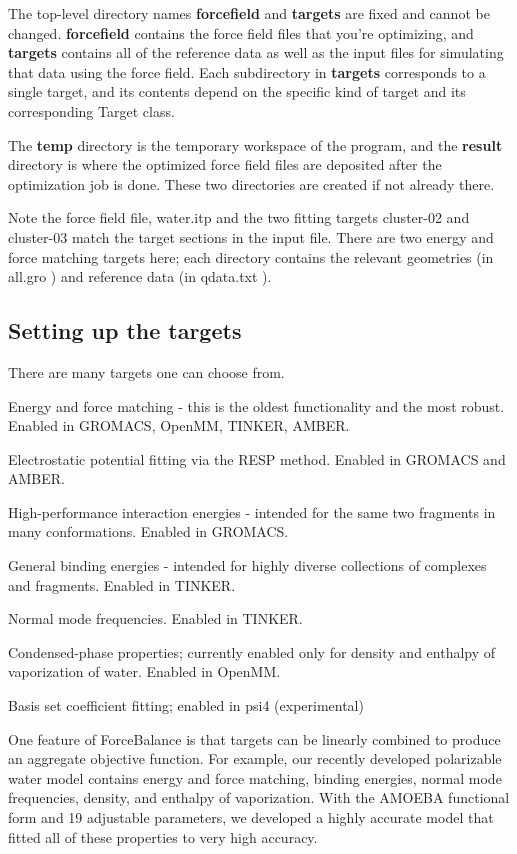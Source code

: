 The top-\/level directory names {\bfseries forcefield} and {\bfseries targets} are fixed and cannot be changed. {\bfseries forcefield} contains the force field files that you're optimizing, and {\bfseries targets} contains all of the reference data as well as the input files for simulating that data using the force field. Each subdirectory in {\bfseries targets} corresponds to a single target, and its contents depend on the specific kind of target and its corresponding {\ttfamily Target} class.

The {\bfseries temp} directory is the temporary workspace of the program, and the {\bfseries result} directory is where the optimized force field files are deposited after the optimization job is done. These two directories are created if not already there.

Note the force field file, {\ttfamily water.\-itp} and the two fitting targets {\ttfamily cluster-\/02} and {\ttfamily cluster-\/03} match the {\ttfamily target} sections in the input file. There are two energy and force matching targets here; each directory contains the relevant geometries (in {\ttfamily all.\-gro} ) and reference data (in {\ttfamily qdata.\-txt} ).\hypertarget{usage_targets}{}\subsection{Setting up the targets}\label{usage_targets}
There are many targets one can choose from.

\begin{DoxyItemize}
\item Energy and force matching -\/ this is the oldest functionality and the most robust. Enabled in G\-R\-O\-M\-A\-C\-S, Open\-M\-M, T\-I\-N\-K\-E\-R, A\-M\-B\-E\-R. \item Electrostatic potential fitting via the R\-E\-S\-P method. Enabled in G\-R\-O\-M\-A\-C\-S and A\-M\-B\-E\-R. \item High-\/performance interaction energies -\/ intended for the same two fragments in many conformations. Enabled in G\-R\-O\-M\-A\-C\-S. \item General binding energies -\/ intended for highly diverse collections of complexes and fragments. Enabled in T\-I\-N\-K\-E\-R. \item Normal mode frequencies. Enabled in T\-I\-N\-K\-E\-R. \item Condensed-\/phase properties; currently enabled only for density and enthalpy of vaporization of water. Enabled in Open\-M\-M. \item Basis set coefficient fitting; enabled in psi4 (experimental)\end{DoxyItemize}
One feature of Force\-Balance is that targets can be linearly combined to produce an aggregate objective function. For example, our recently developed polarizable water model contains energy and force matching, binding energies, normal mode frequencies, density, and enthalpy of vaporization. With the A\-M\-O\-E\-B\-A functional form and 19 adjustable parameters, we developed a highly accurate model that fitted all of these properties to very high accuracy.

